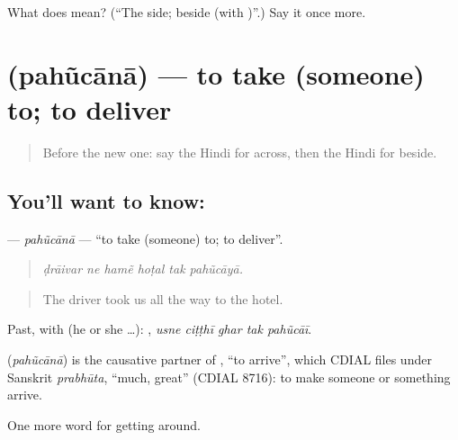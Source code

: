\begin{tcolorbox}[breakable,colback=teal!4,colframe=teal!35!black,title={Before you move on}]
What does  mean? (\textquotedblleft{}The side; beside (with )\textquotedblright{}.) Say it once more.
\end{tcolorbox}
\section[\texorpdfstring{\hi{पहुँचाना} (pahũcānā)}{पहुँचाना (pahũcānā)}]{ (pahũcānā) — to take (someone) to; to deliver}

\label{lesson:HI-C418-pahucana}



\begin{quote}
Before the new one: say the Hindi for across, then the Hindi for beside.
\end{quote}

\subsection*{You'll want to know: }
\textbf{} — \emph{pahũcānā} — \textquotedblleft{}to take (someone) to; to deliver\textquotedblright{}.

\begin{quote}
     
\end{quote}

\begin{quote}
\emph{ḍrāivar ne hamẽ hoṭal tak pahũcāyā.}
\end{quote}

\begin{quote}
The driver took us all the way to the hotel.
\end{quote}

Past, with  (he or she …):     , \emph{usne ciṭṭhī ghar tak pahũcāī}.

\begin{cousinweb}
\textbf{} (\emph{pahũcānā}) is the causative partner of , \textquotedblleft{}to arrive\textquotedblright{}, which CDIAL files under Sanskrit \emph{prabhūta}, \textquotedblleft{}much, great\textquotedblright{} (CDIAL 8716): to make someone or something arrive.
\end{cousinweb}

\begin{grammarlens}[title={What you've built}]
One more word for getting around.
\end{grammarlens}

